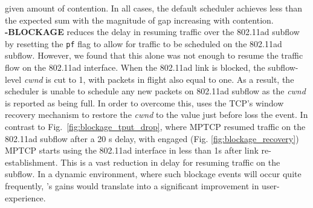 given amount of contention. In all cases, the default scheduler
achieves less than the expected sum with the magnitude of gap
increasing with contention.
\\
\noindent\textbf{\name-BLOCKAGE} reduces the delay in resuming traffic over the 802.11ad
subflow by resetting the {{\tt pf}} flag to allow for traffic to be
scheduled on the 802.11ad subflow. However, we found that this alone
was not enough to resume the traffic flow on the 802.11ad
interface. When the 802.11ad link is blocked, the
subflow-level \emph{cwnd} is cut to 1, with packets in flight also
equal to one. As a result, the scheduler is unable to schedule any new
packets on 802.11ad subflow as the \emph{cwnd} is reported as being
full. In order to overcome this, \name uses the TCP's window recovery
mechanism to restore the \emph{cwnd} to the value just before loss the
event. In contrast to Fig.~\ref{fig:blockage_tput_drop}, where MPTCP resumed traffic on the
802.11ad subflow after a 20 s delay, with \name engaged (Fig. \ref{fig:blockage_recovery}) 
MPTCP starts using the 802.11ad interface in less than 1s after link re-establishment. This
is a vast reduction in delay for resuming traffic on the subflow. In a
dynamic environment, where such blockage events will occur quite
frequently, \name's gains would translate into a significant
improvement in user-experience.
